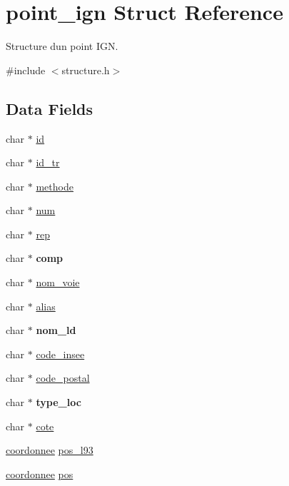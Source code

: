 \hypertarget{structpoint__ign}{}\section{point\+\_\+ign Struct Reference}
\label{structpoint__ign}


Structure d\textquotesingle{}un point I\+GN.  




{\ttfamily \#include $<$structure.\+h$>$}

\subsection*{Data Fields}
\begin{DoxyCompactItemize}
\item 
char $\ast$ \hyperlink{structpoint__ign_a704832d5fa3eab57fb9baa215ca7c736}{id}
\item 
char $\ast$ \hyperlink{structpoint__ign_a113ee6be0a8709a75afb5211112aaf93}{id\+\_\+tr}
\item 
char $\ast$ \hyperlink{structpoint__ign_ab634196a26204fa50249254e42803b14}{methode}
\item 
char $\ast$ \hyperlink{structpoint__ign_a96809dab426ba9478803c60f91662809}{num}
\item 
char $\ast$ \hyperlink{structpoint__ign_a2774caa7344e2586bd20a91a9c1fc0be}{rep}
\item 
char $\ast$ {\bfseries comp}\hypertarget{structpoint__ign_ae5cc370fe5b26bf60c5e72b798e3151b}{}\label{structpoint__ign_ae5cc370fe5b26bf60c5e72b798e3151b}

\item 
char $\ast$ \hyperlink{structpoint__ign_a6f967ee4079482aaec6a98393814f57f}{nom\+\_\+voie}
\item 
char $\ast$ \hyperlink{structpoint__ign_a6c7451a24f2bd49eb212f1d32ec0bbb5}{alias}
\item 
char $\ast$ {\bfseries nom\+\_\+ld}\hypertarget{structpoint__ign_ab077228338b2d49f975626fa02690a68}{}\label{structpoint__ign_ab077228338b2d49f975626fa02690a68}

\item 
char $\ast$ \hyperlink{structpoint__ign_ad0a97659d6e223158971c488a5145bf7}{code\+\_\+insee}
\item 
char $\ast$ \hyperlink{structpoint__ign_a0e02aa443eb7535faef42838dcb5b8e4}{code\+\_\+postal}
\item 
char $\ast$ {\bfseries type\+\_\+loc}\hypertarget{structpoint__ign_a233a06b3c8cd25d735c8fa1ef93ecb16}{}\label{structpoint__ign_a233a06b3c8cd25d735c8fa1ef93ecb16}

\item 
char $\ast$ \hyperlink{structpoint__ign_a1a4fa8b272ab85c8954aaeaea028a2ab}{cote}
\item 
\hyperlink{structcoordonnee}{coordonnee} \hyperlink{structpoint__ign_af56717fd3b1fefefe988272eab34b0a0}{pos\+\_\+l93}
\item 
\hyperlink{structcoordonnee}{coordonnee} \hyperlink{structpoint__ign_a34c5f3410fedaa7abc87cbb37914f313}{pos}
\end{DoxyCompactItemize}


